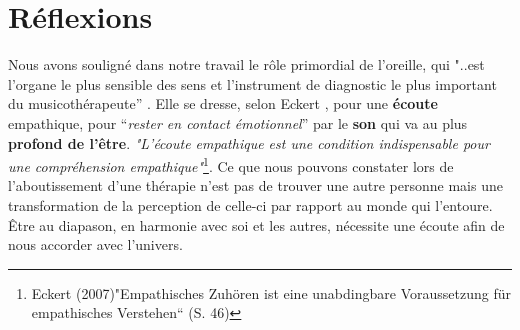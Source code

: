 









\chapter{Réflexions}






Nous avons souligné dans notre travail le rôle primordial de
l'oreille, qui "..est l'organe le plus sensible des
sens et l'instrument de diagnostic le plus important du
musicothérapeute'' \autocite{seminar_zuerich}.
Elle se dresse, selon Eckert \autocite{seminar_zuerich}, pour une\textbf{ écoute} empathique, pour ``\textit{rester en contact émotionnel}'' par le \textbf{son} qui va au plus \textbf{profond de
  l'être}. \textit{"L'écoute empathique est une condition indispensable
  pour une compréhension empathique"}\footnote{Eckert (2007)"Empathisches Zuhören ist eine unabdingbare Voraussetzung für empathisches Verstehen“ (S. 46)}.
Ce que nous pouvons constater lors de l'aboutissement
d'une thérapie n'est pas de trouver une autre personne mais une transformation
de la perception de celle-ci par rapport au monde qui l'entoure.
Être au diapason, en harmonie avec soi et les autres, nécessite une
écoute afin de nous accorder avec l'univers.

